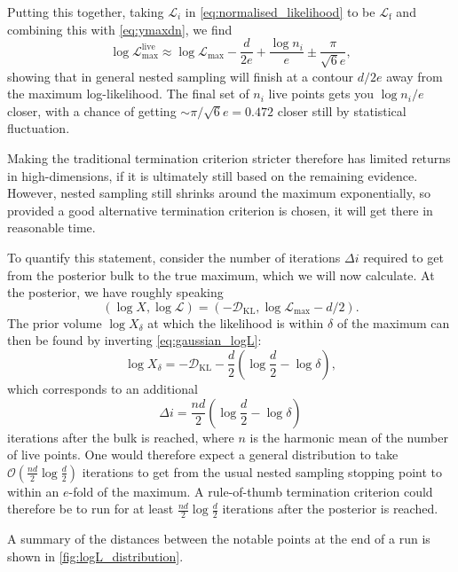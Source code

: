 \documentclass[usenatbib]{mnras}
\newcommand{\Like}{\mathcal{L}}
\newcommand{\DKL}{\mathcal{D}_\mathrm{KL}}
\newcommand{\logLmax}{\log \Like_\mathrm{max}}
\begin{document}
\par
Putting this together, taking $\mathcal{L}_i$ in \eqref{eq:normalised_likelihood} to be $\mathcal{L}_\mathrm{f}$ and combining this with \eqref{eq:ymaxdn}, we find
\begin{equation}
    \boxed{
        \log{\mathcal{L}}_\mathrm{max}^\mathrm{live} \approx \log\mathcal{L}_\mathrm{max} - \frac{d}{2e} + \frac{\log n_i}{e} \pm \frac{\pi}{\sqrt{6}e}
    },
\end{equation}
showing that in general nested sampling will finish at a contour $d/2e$ away from the maximum log-likelihood. The final set of $n_i$ live points gets you $\log n_i/e$ closer, with a chance of getting $\sim\pi/\sqrt{6}e=0.472$ closer still by statistical fluctuation. 
\par
Making the traditional termination criterion stricter therefore has limited returns in high-dimensions, if it is ultimately still based on the remaining evidence. However, nested sampling still shrinks around the maximum exponentially, so provided a good alternative termination criterion is chosen, it will get there in reasonable time. 

To quantify this statement, consider the number of iterations $\Delta i$ required to get from the posterior bulk to the true maximum, which we will now calculate. At the posterior, we have roughly speaking
\begin{equation}
    (\log X, \log\Like) = (-\DKL, \logLmax - d/2).
\end{equation}
The prior volume $\log X_\delta$ at which the likelihood is within $\delta$ of the maximum can then be found by inverting \cref{eq:gaussian_logL}:
\begin{equation}
    \log X_\delta = -\DKL - \frac{d}{2} \left(\log \frac{d}{2} - \log \delta\right),
\end{equation}
which corresponds to an additional
\begin{equation}
    \Delta i = \frac{nd}{2} \left(\log \frac{d}{2} - \log \delta\right)
\end{equation}
iterations after the bulk is reached, where $n$ is the harmonic mean of the number of live points. One would therefore expect a general distribution to take $\mathcal{O}(\tfrac{n d }{2}\log \tfrac{d}{2})$ iterations to get from the usual nested sampling stopping point to within an $e$-fold of the maximum. A rule-of-thumb termination criterion could therefore be to run for at least $\tfrac{nd}{2}\log\tfrac{d}{2}$ iterations after the posterior is reached.
\par
A summary of the distances between the notable points at the end of a run is shown in \cref{fig:logL_distribution}.
\end{document}
